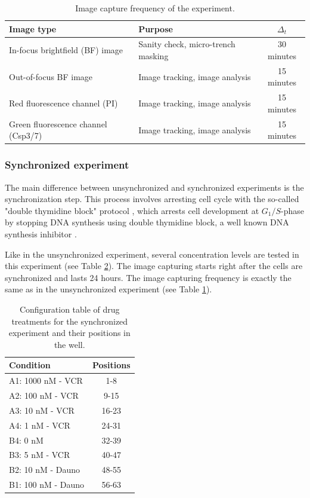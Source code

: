 \documentclass[pdftex,12pt,a4paper]{report}
\begin{document}
\begin{table}[H]
\centering
\begin{tabular}{ l | l | c }
\hline
Image type & Purpose & $\Delta_t$ \\
\hline\hline
In-focus brightfield (BF) image & Sanity check, micro-trench masking & 30 minutes \\
Out-of-focus BF image & Image tracking, image analysis & 15 minutes \\
Red fluorescence channel (PI)& Image tracking, image analysis & 15 minutes \\
Green fluorescence channel (Csp3/7) & Image tracking, image analysis & 15 minutes \\
\hline
\end{tabular}
\caption{Image capture frequency of the experiment.}
\label{table:image_capture_frequency}
\end{table}


\subsubsection{Synchronized experiment}
\label{subsection:synchronized_experiment}

The main difference between unsynchronized and synchronized experiments is the synchronization step. This process involves arresting cell cycle with the so-called "double thymidine block" protocol \cite{harper2005synchronization}, which arrests cell development at $G_1/S$-phase by stopping DNA synthesis using double thymidine block, a well known DNA synthesis inhibitor \cite{bostock1971evaluation}.

Like in the unsynchronized experiment, several concentration levels are tested in this experiment (see Table \ref{table:syn_treatments}). The image capturing starts right after the cells are synchronized and lasts 24 hours. The image capturing frequency is exactly the same as in the unsynchronized experiment (see Table \ref{table:image_capture_frequency}).

\begin{table}[H]
\centering
\begin{tabular}{ l | c }
\hline
Condition & Positions \\
\hline\hline
A1: 1000 nM - VCR & 1-8 \\
A2: 100 nM - VCR & 9-15 \\
A3: 10 nM - VCR & 16-23 \\
A4: 1 nM - VCR & 24-31 \\
B4: 0 nM & 32-39 \\
B3: 5 nM - VCR & 40-47 \\
B2: 10 nM - Dauno & 48-55 \\
B1: 100 nM - Dauno & 56-63 \\
\hline
\end{tabular}
\caption{Configuration table of drug treatments for the synchronized experiment and their positions in the well.}
\label{table:syn_treatments}
\end{table}
\end{document}
